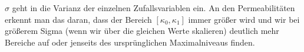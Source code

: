 \begin{figure}[H]
	\centering
\end{figure}
$\sigma$ geht in die Varianz der einzelnen Zufallsvariablen ein. An den Permeabilitäten erkennt man das daran, dass der Bereich $[\kappa_0,\kappa_1] $ immer größer wird und wir bei größerem Sigma (wenn wir über die gleichen Werte skalieren) deutlich mehr Bereiche auf oder jenseits des ursprünglichen Maximalniveaus finden.
